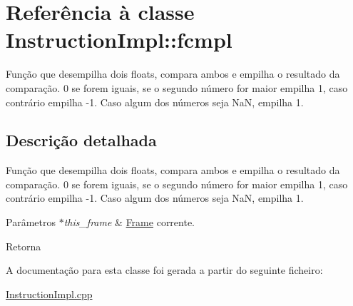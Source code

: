 \hypertarget{class_instruction_impl_1_1fcmpl}{}\section{Referência à classe Instruction\+Impl\+:\+:fcmpl}
\label{class_instruction_impl_1_1fcmpl}


Função que desempilha dois floats, compara ambos e empilha o resultado da comparação. 0 se forem iguais, se o segundo número for maior empilha 1, caso contrário empilha -\/1. Caso algum dos números seja NaN, empilha 1.  




\subsection{Descrição detalhada}
Função que desempilha dois floats, compara ambos e empilha o resultado da comparação. 0 se forem iguais, se o segundo número for maior empilha 1, caso contrário empilha -\/1. Caso algum dos números seja NaN, empilha 1. 


\begin{DoxyParams}{Parâmetros}
{\em $\ast$this\+\_\+frame} & \hyperlink{struct_frame}{Frame} corrente. \\
\hline
\end{DoxyParams}
\begin{DoxyReturn}{Retorna}

\end{DoxyReturn}


A documentação para esta classe foi gerada a partir do seguinte ficheiro\+:\begin{DoxyCompactItemize}
\item 
\hyperlink{_instruction_impl_8cpp}{Instruction\+Impl.\+cpp}\end{DoxyCompactItemize}
